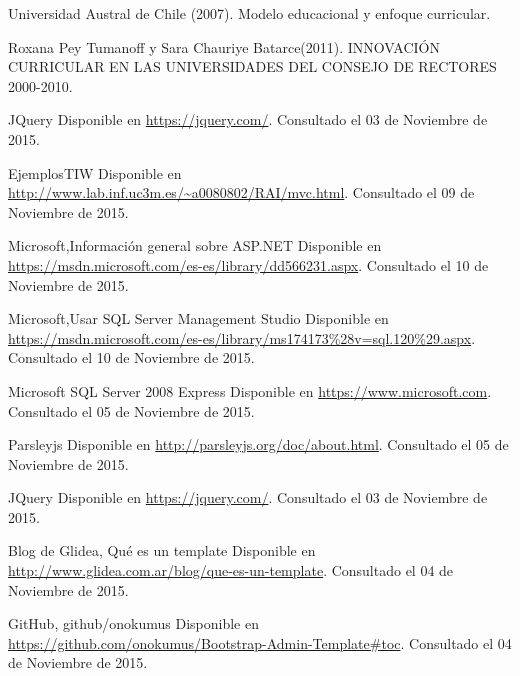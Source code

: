 \begin{spacing}{1.0}
\begin{thebibliography}{99}  

\newblock Universidad Austral de Chile (2007).
\newblock Modelo educacional y enfoque curricular. 

\newblock Roxana Pey Tumanoff y Sara Chauriye Batarce(2011).
\newblock INNOVACIÓN CURRICULAR EN LAS UNIVERSIDADES DEL CONSEJO DE RECTORES 2000-2010. 


\newblock JQuery
\newblock Disponible en \url{https://jquery.com/}.
\newblock Consultado el 03 de Noviembre de 2015.

\newblock EjemplosTIW
\newblock Disponible en \url{http://www.lab.inf.uc3m.es/~a0080802/RAI/mvc.html}.
\newblock Consultado el 09 de Noviembre de 2015.

\newblock Microsoft,Información general sobre ASP.NET
\newblock Disponible en \url{https://msdn.microsoft.com/es-es/library/dd566231.aspx}.
\newblock Consultado el 10 de Noviembre de 2015.

\newblock Microsoft,Usar SQL Server Management Studio
\newblock Disponible en \url{https://msdn.microsoft.com/es-es/library/ms174173%28v=sql.120%29.aspx}.
\newblock Consultado el 10 de Noviembre de 2015.

\newblock Microsoft SQL Server 2008 Express 
\newblock Disponible en \url{https://www.microsoft.com}.
\newblock Consultado el 05 de Noviembre de 2015.

\newblock Parsleyjs
\newblock Disponible en \url{http://parsleyjs.org/doc/about.html}.
\newblock Consultado el 05 de Noviembre de 2015.

\newblock JQuery
\newblock Disponible en \url{https://jquery.com/}.
\newblock Consultado el 03 de Noviembre de 2015.

\newblock Blog de Glidea, Qué es un template
\newblock Disponible en \url{http://www.glidea.com.ar/blog/que-es-un-template}.
\newblock Consultado el 04 de Noviembre de 2015.

\newblock GitHub, github/onokumus
\newblock Disponible en \url{https://github.com/onokumus/Bootstrap-Admin-Template#toc}.
\newblock Consultado el 04 de Noviembre de 2015.


\end{thebibliography}
\end{spacing}
